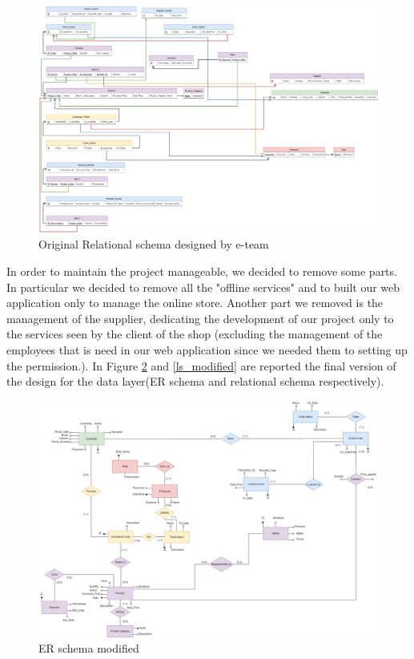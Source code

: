 \begin{figure}[H]
\centering
\includegraphics[width=16.5cm]{Schemas/LogicRS_original.jpg}
\caption{Original Relational schema designed by e-team}
\label{ls_original}
\end{figure}
\restoregeometry
In order to maintain the project manageable, we decided to remove some parts. In particular we decided to remove all the "offline services" and to built our web application only to manage the online store.
Another part we removed is the management of the supplier, dedicating the development of our project only to the services seen by the client of the shop (excluding the management of the employees that is need in our web application since we needed them to setting up the permission.). In Figure \ref{er_modified} and \ref{ls_modified} are reported the final version of the design for the data layer(ER schema and relational schema respectively).

\begin{figure}[H]
\centering
\includegraphics[width=16.5cm]{Schemas/ER_modified.jpg}
\caption{ER schema modified}
\label{er_modified}
\end{figure}

